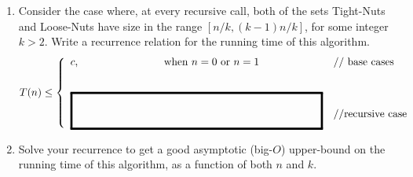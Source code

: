 \documentclass[11pt]{article}
\newcommand{\fillinblankmath}[1]{\begingroup\setlength{\fboxsep}{1em}\setlength{\fboxrule}{2pt}\fbox{\LARGE\phantom{#1}}\endgroup}
\def\question#1{\red{#1}}
\def\red#1{{\color{red}#1}}
\begin{document}
\begin{enumerate}
\item Consider  the case  where,  at  every recursive  call,  both  of the  sets
Tight-Nuts and  Loose-Nuts have size  in the range $[n/k,  (k-1)n/k]$, for
some  integer $k  > 2$.  
\question{Write  a recurrence  relation for the running time of this algorithm.}
\[
   T(n) \le \left\{ \begin{array}{ll} 
                    c, \qquad \qquad \qquad \qquad\mbox{when $n=0$ or $n=1$} & \mbox{// base cases} \\[.3in]
                    \fillinblankmath{XXXXXXXXXXXXXXXXXX} & // \mbox{recursive case} \\
                    \end{array} \right.
   \]

\item \question{Solve your recurrence to get a good asymptotic (big-$O$) upper-bound on the  running time of this algorithm, as a function of both $n$ and $k$.}
\end{enumerate}
\end{document}
